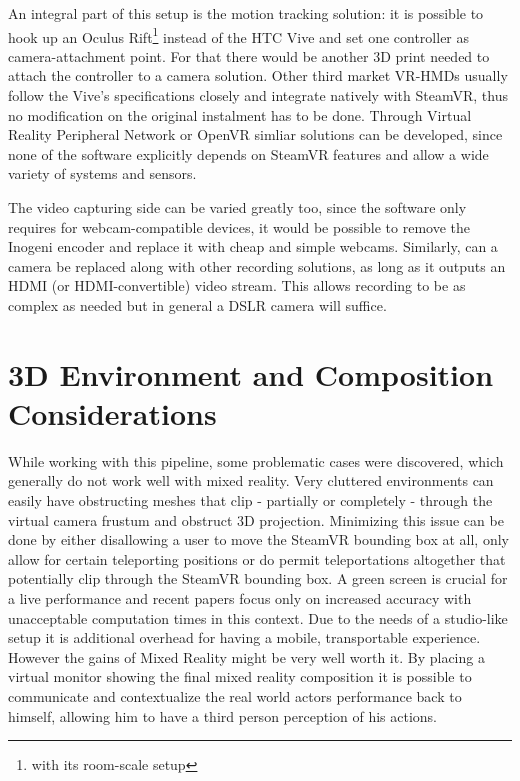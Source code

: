 An integral part of this setup is the motion tracking solution: it is possible 
to hook up an Oculus Rift\footnote{with its room-scale setup} instead of the 
HTC Vive and set one controller as camera-attachment point. For that there 
would be another 3D print needed to attach the controller to a camera solution. 
\newline
Other third market VR-HMDs usually follow the Vive's specifications closely and 
integrate natively with SteamVR, thus no modification on the original 
instalment has to be done.
\newline
Through Virtual Reality Peripheral Network or OpenVR simliar solutions can be 
developed, since none of the software explicitly depends on SteamVR features 
and allow a wide variety of systems and sensors.

The video capturing side can be varied greatly too, since the software only 
requires for webcam-compatible devices, it would be possible to remove 
the Inogeni encoder and replace it with cheap and simple webcams. Similarly, 
can a camera be replaced along with other recording solutions, as long as it 
outputs an HDMI (or HDMI-convertible) video stream. This allows recording to be 
as complex as needed but in general a DSLR camera will suffice.

\section{3D Environment and Composition Considerations}

While working with this pipeline, some problematic cases were discovered, which 
generally do not work well with mixed reality. Very cluttered environments can 
easily have obstructing meshes that clip - partially or completely - through 
the virtual camera frustum and obstruct 3D projection. Minimizing this issue 
can be done by either disallowing a user to move the SteamVR bounding box at 
all, only allow for certain teleporting positions or do permit teleportations 
altogether that potentially clip through the SteamVR bounding box.
\newline
A green screen is crucial for a live performance and recent papers focus only 
on increased accuracy with unacceptable computation times in this context. Due 
to the needs of a studio-like setup it is additional overhead for having a 
mobile, transportable experience. However the gains of Mixed Reality might be 
very well worth it. 
\newline
By placing a virtual monitor showing the final mixed reality composition it is 
possible to communicate and contextualize the real world actors performance 
back to himself, allowing him to have a third person perception of his actions.

